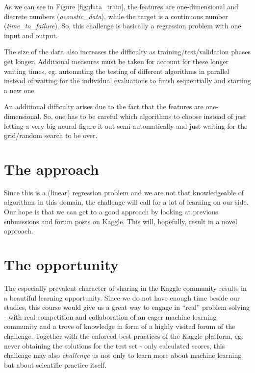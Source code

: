 \documentclass[colorback,accentcolor=tud9c,12pt]{tudreport}
\begin{document}
	
	As we can see in Figure \ref{fig:data_train}, the features are one-dimensional and discrete numbers (\textit{acoustic\_data}), while the target is a continuous number (\textit{time\_to\_failure}).
	So, this challenge is basically a regression problem with one input and output.
	
	
	The size of the data also increases the difficulty as training/test/validation phases get longer. Additional measures must be taken for account for these longer waiting times, eg. automating the testing of different algorithms in parallel instead of waiting for the individual evaluations to finish sequentially and starting a new one.
	
	An additional difficulty arises due to the fact that the features are one-dimensional. So, one has to be careful which algorithms to choose instead of just letting a very big neural figure it out semi-automatically and just waiting for the grid/random search to be over.
	
	\section{The approach}
	Since this is a (linear) regression problem and we are not that knowledgeable of algorithms in this domain, the challenge will call for a lot of learning on our side.
	Our hope is that we can get to a good approach by looking at previous submissions and forum posts on Kaggle.
	This will, hopefully, result in a novel approach.
	
	\section{The opportunity}
	The especially prevalent character of sharing in the Kaggle community results in a beautiful learning opportunity. Since we do not have enough time beside our studies, this course would give us a great way to engage in ``real'' problem solving - with real competition and collaboration of an eager machine learning community and a trove of knowledge in form of a highly visited forum of the challenge.
	Together with the enforced best-practices of the Kaggle platform, eg. never obtaining the solutions for the test set - only calculated scores, this challenge may also \textit{challenge} us not only to learn more about machine learning but about scientific practice itself.
	
\end{document}
